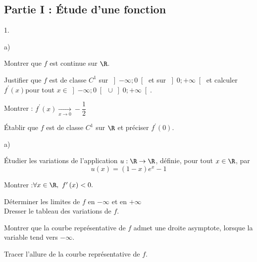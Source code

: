 \documentclass[11pt]{article}%
\begin{document}
\subsection*{Partie I : Étude d'une fonction}

\begin{noliste}{1.}
 \setlength{\itemsep}{4mm}
\item 
\begin{noliste}{a)}
 \setlength{\itemsep}{2mm}
\item Montrer que $f$ est continue sur $\R$.

\item Justifier que $f$ est de classe $C^{1}$ sur $\left] -\infty
;0\right[ $
et sur $\left] 0; + \infty \right[ $ et calculer $f^{\prime }\left(
x\right) $pour tout $x\in \left] -\infty ;0\right[ \ \cup \left] 0; +
\infty \right[ $.

\item Montrer : \texttt{\hspace*{1cm}}$f^{\prime }\left( x\right)
\underset{x\rightarrow 0}{\rightarrow }-\dfrac{1}{2}$

\item Établir que $f$ est de classe $C^{1}$ sur $\R$ et préciser
$f^{\prime }\left( 0\right) $.
\end{noliste}

\item 
\begin{noliste}{a)}
 \setlength{\itemsep}{2mm}
\item Étudier les variations de l'application $u :\R\rightarrow 
\R$, définie, pour tout $x\in \R$, par 
\[
u\left( x\right) = \left( 1-x\right) e^{x}-1
\]

\item Montrer :\texttt{\hspace*{1cm}}$\forall x\in \R,\ f^{\prime
}\left( x\right) <0.$

\item Déterminer les limites de $f$ en $-\infty $ et en $ + \infty $ 
\\
Dresser le tableau des variations de $f$.

\item Montrer que la courbe représentative de $f$ admet une droite
asymptote, lorsque la variable tend vers $-\infty $.

\item Tracer l'allure de la courbe représentative de $f$.
\end{noliste}
\end{noliste}
\end{document}
